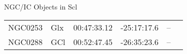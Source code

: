 \begin{block}{NGC/IC Objects in Scl}
  \centering
  \begin{tabularx}{\textwidth}{llrrll} \toprule 
    NGC0253 & Glx & 00:47:33.12 & -25:17:17.6  & -- \\ 
    NGC0288 & GCl & 00:52:47.45 & -26:35:23.6  & -- \\ 
  \end{tabularx}
\end{block}